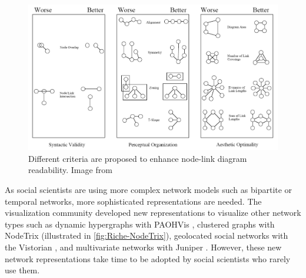 \begin{figure}
    \centering %
    \includegraphics[width=1\textwidth]{static/figures/RelatedWork/Kosak-nodelinkdiagramMetrics}
    \caption{Different criteria are proposed to enhance node-link diagram readability. Image from \cite{kosakAutomatingLayoutNetwork1994}}
    \label{fig:kosak-graph-drawing}
\end{figure}

As social scientists are using more complex network models such as bipartite or temporal networks, more sophisticated representations are needed.
The visualization community developed new representations to visualize other network types such as dynamic hypergraphs with PAOHVis \cite{valdiviaAnalyzingDynamicHypergraphs2021}, clustered graphs with NodeTrix \cite{henryNodeTrixHybridVisualization2007} (illustrated in \autoref{fig:Riche-NodeTrix}), geolocated social networks with the Vistorian \cite{serranomolineroUnderstandingUseVistorian2017}, and multivariate networks with Juniper \cite{nobreJuniperTreeTable2019}.
However, these new network representations take time to be adopted by social scientists who rarely use them.


